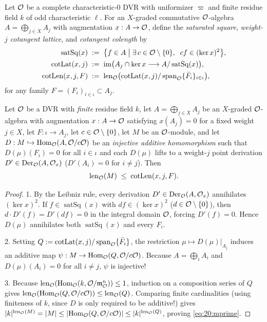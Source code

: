 Let $\mathcal{O}$ be a complete characteristic-$0$ DVR with uniformizer $\varpi$ and finite residue field $k$ of odd characteristic $\ell$. For an $X$-graded commutative $\mathcal{O}$-algebra $A = \bigoplus_{j \in X} A_j$ with augmentation $x : A \to \mathcal{O}$, define the \emph{saturated square}, \emph{weight-$j$ cotangent lattice}, and \emph{cotangent colength} by
\begin{align}
\label{eq:20:cot-defs}
  \operatorname{satSq}(x) &\;:=\; \bigl\{f \in A \;\big|\; \exists\, c \in \mathcal{O} \setminus \{0\},\;\; c f \in (\ker x)^2\bigr\}, \\
  \operatorname{cotLat}(x, j) &\;:=\; \operatorname{im}\bigl(A_j \cap \ker x \longrightarrow A / \operatorname{satSq}(x)\bigr), \\
  \operatorname{cotLen}(x, j, F) &\;:=\; \operatorname{len}_{\mathcal{O}}\bigl(\operatorname{cotLat}(x, j) / \operatorname{span}_{\mathcal{O}}\{\bar{F}_i\}_{i \in \iota}\bigr),
\end{align}
for any family $F = (F_i)_{i \in \iota} \subset A_j$.

\begin{lemma}
\label{lem:20:lemma-mprime}
Let $\mathcal{O}$ be a DVR with \emph{finite} residue field $k$, let $A = \bigoplus_{j \in X} A_j$ be an $X$-graded $\mathcal{O}$-algebra with augmentation $x : A \to \mathcal{O}$ satisfying $x(A_j) = 0$ for a fixed weight $j \in X$, let $F : \iota \to A_j$, let $c \in \mathcal{O} \setminus \{0\}$, let $M$ be an $\mathcal{O}$-module, and let $D : M \hookrightarrow \mathrm{Hom}_{\mathcal{O}}(A, \mathcal{O}/c\mathcal{O})$ be an \emph{injective additive homomorphism} such that $D(\mu)(F_i) = 0$ for all $i \in \iota$ and each $D(\mu)$ lifts to a weight-$j$ point derivation $D' \in \operatorname{Der}_{\mathcal{O}}(A, \mathcal{O}_x)$ ($D'(A_i) = 0$ for $i \neq j$). Then
\begin{equation}
\label{eq:20:mprime}
  \operatorname{len}_{\mathcal{O}}(M) \;\le\; \operatorname{cotLen}(x, j, F).
\end{equation}
\end{lemma}

\begin{proof}
1. By the Leibniz rule, every derivation $D' \in \operatorname{Der}_{\mathcal{O}}(A, \mathcal{O}_x)$ annihilates $(\ker x)^2$. If $f \in \operatorname{satSq}(x)$ with $d f \in (\ker x)^2$ ($d \in \mathcal{O} \setminus \{0\}$), then $d\cdot D'(f) = D'(d f) = 0$ in the integral domain $\mathcal{O}$, forcing $D'(f) = 0$. Hence $D(\mu)$ annihilates both $\operatorname{satSq}(x)$ and every $F_i$.

2. Setting $Q := \operatorname{cotLat}(x, j) / \operatorname{span}_{\mathcal{O}}\{\bar{F}_i\}$, the restriction $\mu \mapsto D(\mu)|_{A_j}$ induces an additive map $\psi : M \to \mathrm{Hom}_{\mathcal{O}}(Q, \mathcal{O}/c\mathcal{O})$. Because $A = \bigoplus_i A_i$ and $D(\mu)(A_i) = 0$ for all $i \neq j$, $\psi$ is injective!

3. Because $\operatorname{len}_{\mathcal{O}}(\mathrm{Hom}_{\mathcal{O}}(k, \mathcal{O}/\mathfrak{m}_{\mathcal{O}}^n)) \le 1$, induction on a composition series of $Q$ gives $\operatorname{len}_{\mathcal{O}}(\mathrm{Hom}_{\mathcal{O}}(Q, \mathcal{O}/c\mathcal{O})) \le \operatorname{len}_{\mathcal{O}}(Q)$. Comparing finite cardinalities (using finiteness of $k$, since $D$ is only required to be additive!) gives $|k|^{\operatorname{len}_{\mathcal{O}}(M)} = |M| \le |\mathrm{Hom}_{\mathcal{O}}(Q, \mathcal{O}/c\mathcal{O})| \le |k|^{\operatorname{len}_{\mathcal{O}}(Q)}$, proving \eqref{eq:20:mprime}.
\end{proof}

